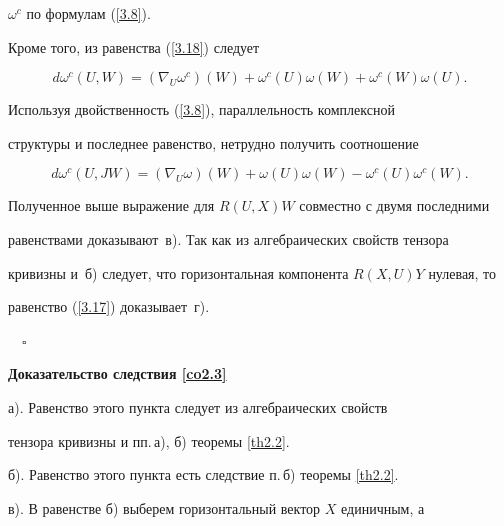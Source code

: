 $\omega^c$ по формулам (\ref{3.8}).


Кроме того, из равенства (\ref{3.18}) следует


$$




d\omega^c(U,W)=(\nabla_U\omega^c)(W)+


\omega^c(U)\omega (W)+ \omega^c(W)\omega (U).


\label{3.20}




$$


Используя двойственность (\ref{3.8}), параллельность комплексной


структуры и последнее равенство, нетрудно получить соотношение


$$




d\omega^c(U,JW)=(\nabla_U\omega )(W)+\omega (U)\omega (W)-


\omega^c(U)\omega^c(W).


\label{3.21}




$$


Полученное выше выражение для $R(U,X)W$ совместно с двумя последними


равенствами доказывают~в). Так как из алгебраических свойств тензора


кривизны и~б) следует, что горизонтальная компонента $R(X,U)Y$ нулевая, то


равенство (\ref{3.17}) доказывает~г).


$\quad\square$


\medskip





{\bf Доказательство следствия \ref{co2.3}}


а). Равенство этого пункта следует из алгебраических свойств


тензора кривизны и пп.\,а), б) теоремы \ref{th2.2}.





б). Равенство этого пункта есть следствие п.\,б) теоремы \ref{th2.2}.





в). В равенстве б) выберем горизонтальный вектор $X$ единичным, а


